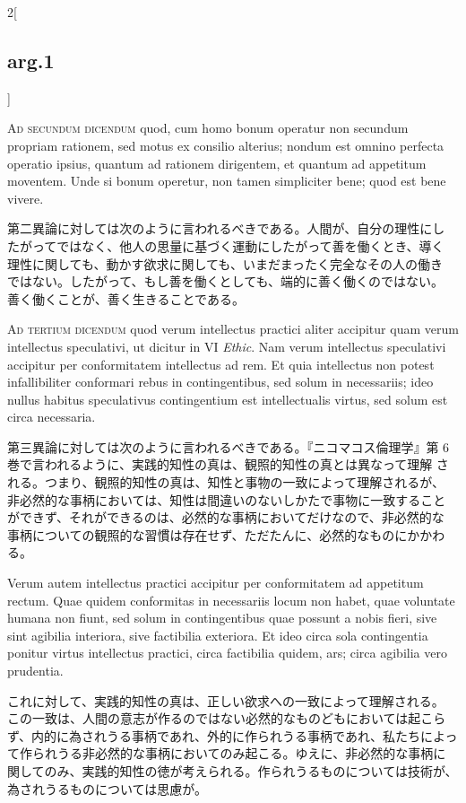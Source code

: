 \documentclass[paper=a4paper,fontsize=10pt,jafontsize=9pt,titlepage]{jlreq}
\begin{document}
\begin{paracol}{2}[\subsection{arg.1}]
\switchcolumn*[\subsection{ad.2}]

{\scshape Ad secundum dicendum} quod, cum homo bonum operatur non
secundum propriam rationem, sed motus ex consilio alterius; nondum est
omnino perfecta operatio ipsius, quantum ad rationem dirigentem, et
quantum ad appetitum moventem. Unde si bonum operetur, non tamen
simpliciter bene; quod est bene vivere.

\switchcolumn

第二異論に対しては次のように言われるべきである。人間が、自分の理性にし
たがってではなく、他人の思量に基づく運動にしたがって善を働くとき、導く
理性に関しても、動かす欲求に関しても、いまだまったく完全なその人の働き
ではない。したがって、もし善を働くとしても、端的に善く働くのではない。
善く働くことが、善く生きることである。

\switchcolumn*[\subsection{ad.3}]

{\scshape Ad tertium dicendum} quod verum intellectus practici aliter
accipitur quam verum intellectus speculativi, ut dicitur in VI
{\itshape Ethic}. Nam verum intellectus speculativi accipitur per
conformitatem intellectus ad rem. Et quia intellectus non potest
infallibiliter conformari rebus in contingentibus, sed solum in
necessariis; ideo nullus habitus speculativus contingentium est
intellectualis virtus, sed solum est circa necessaria.

\switchcolumn

第三異論に対しては次のように言われるべきである。『ニコマコス倫理学』第
6巻で言われるように、実践的知性の真は、観照的知性の真とは異なって理解
される。つまり、観照的知性の真は、知性と事物の一致によって理解されるが、
非必然的な事柄においては、知性は間違いのないしかたで事物に一致すること
ができず、それができるのは、必然的な事柄においてだけなので、非必然的な
事柄についての観照的な習慣は存在せず、ただたんに、必然的なものにかかわ
る。

\switchcolumn*

Verum autem intellectus practici accipitur per conformitatem ad
appetitum rectum. Quae quidem conformitas in necessariis locum non
habet, quae voluntate humana non fiunt, sed solum in contingentibus
quae possunt a nobis fieri, sive sint agibilia interiora, sive
factibilia exteriora. Et ideo circa sola contingentia ponitur virtus
intellectus practici, circa factibilia quidem, ars; circa agibilia
vero prudentia.

\switchcolumn

これに対して、実践的知性の真は、正しい欲求への一致によって理解される。
この一致は、人間の意志が作るのではない必然的なものどもにおいては起こら
ず、内的に為されうる事柄であれ、外的に作られうる事柄であれ、私たちによっ
て作られうる非必然的な事柄においてのみ起こる。ゆえに、非必然的な事柄に
関してのみ、実践的知性の徳が考えられる。作られうるものについては技術が、
為されうるものについては思慮が。

\end{paracol}
\newpage
\end{document}
